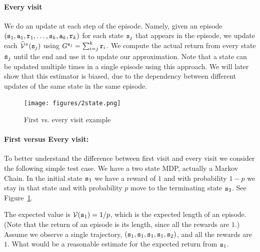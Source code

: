\paragraph{Every visit}
We do an update at each step of the episode. Namely, given an
episode $({\tt s}_1, {\tt a}_1, {\tt r}_1, \ldots ,
{\tt s}_k,{\tt a}_k,{\tt r}_k)$ for each state ${\tt s}_j$ that
appears in the episode, we update each
$\widehat{\mathcal{V}}^\pi({\tt s}_j)$ using
$G^{{\tt s}_j}=\sum_{i=j}^k {\tt r}_i$. We compute the actual
return from every state ${\tt s}_j$ until the end and use it to update
our approximation. Note that a state can be updated multiple times
in  a single episode using this approach. We will later show that
this estimator is biased, due to the dependency between different
updates of the same state in the same episode.



\begin{figure}
  \begin{centering}
 \texttt{[image: figures/2state.png]}\\
  \caption{First vs. every visit example}\label{fig:2state}
  \end{centering}
\end{figure}

\paragraph{First versus Every visit:}
%
To better understand the difference between first visit and every
visit we consider the following simple test case. We have a two
state MDP, actually a Markov Chain. In the initial state ${\tt s}_1$
we have a reward of $1$ and with probability $1-p$ we stay in that
state and with probability $p$ move to the terminating state
${\tt s}_2$. See Figure~\ref{fig:2state}.

The expected value is $\mathcal{V}({\tt s}_1)=1/p$, which is the expected
length of an episode. (Note that the return of an episode is its
length, since all the rewards are $1$.) Assume we observe a single
trajectory, $({\tt s}_1,{\tt s}_1,{\tt s}_1,{\tt s}_1,{\tt s}_2)$, and
all the rewards are $1$. What would be a reasonable estimate for the
expected return from ${\tt s}_1$.

